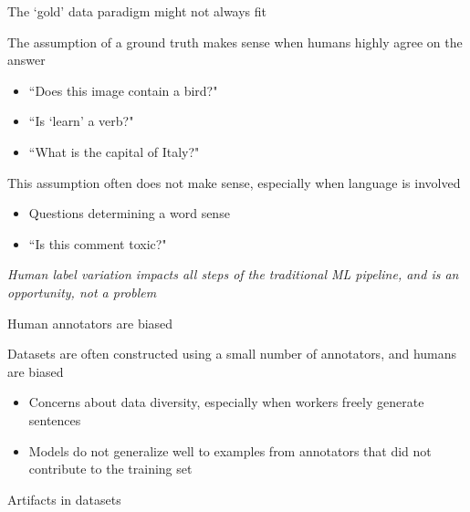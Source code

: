 \documentclass[12pt,aspectratio=169,handout]{beamer}
\begin{document}
\begin{frame}{The `gold' data paradigm might not always fit}

The assumption of a ground truth makes sense when humans highly agree on the answer

\begin{itemize}
	\item ``Does this image contain a bird?"
	\item ``Is `learn' a verb?"
	\item ``What is the capital of Italy?"
\end{itemize}

This assumption often does not make sense, especially when language is involved

\begin{itemize}
	\item Questions determining a word sense
	\item ``Is this comment toxic?"
\end{itemize}

\emph{Human label variation impacts all steps of the traditional ML pipeline, and is an opportunity, not a problem}


\end{frame} \begin{frame}{ Human annotators are biased}

Datasets are often constructed using a small number of annotators, and humans are biased

\begin{itemize}
	\item Concerns about data diversity, especially when workers freely generate sentences
	\item Models do not generalize well to examples from annotators that did not contribute to the training set
\end{itemize}


\end{frame} \begin{frame}{Artifacts in datasets}


\end{frame}
\end{document}
